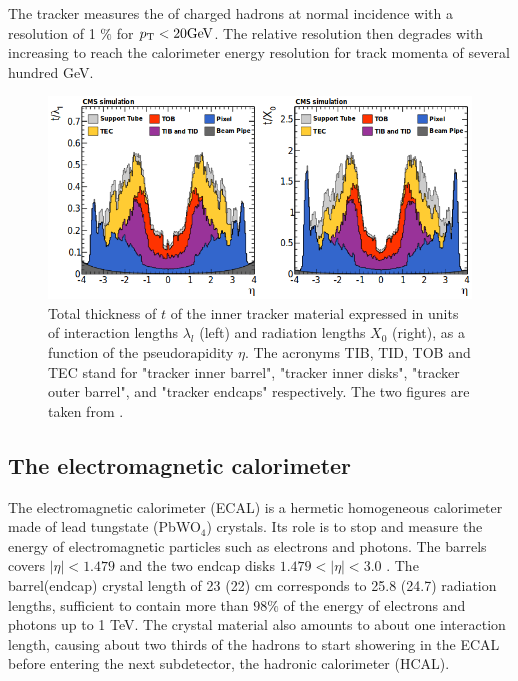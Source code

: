 The tracker measures the \pt of charged hadrons at normal incidence with a resolution of 1 $\%$ for $p_{\mathrm{T}} < 20 \mathrm{GeV}$. The relative resolution then degrades with increasing \pt to reach the calorimeter energy resolution for track momenta of several hundred GeV.

\begin{figure}
    \centering
    \includegraphics[width=\textwidth]{Images/trackerthickness.png}
    \caption{Total thickness of $t$ of the inner tracker material expressed in units of interaction lengths $\lambda_{l}$ (left) and radiation lengths $X_{0}$ (right), as a function of the pseudorapidity $\eta$. The acronyms TIB, TID, TOB and TEC stand for "tracker inner barrel", "tracker inner disks", "tracker outer barrel", and "tracker endcaps" respectively. The two figures are taken from \cite{Collaboration_2014}.}
    \label{fig:tracker_material}
\end{figure}

\subsection{The electromagnetic calorimeter}

The electromagnetic calorimeter (ECAL) \cite{CERN-LHCC-97-033,Bloch:581342} is a hermetic homogeneous calorimeter made of lead tungstate (PbWO$_4$) crystals. Its role is to stop and measure the energy of electromagnetic particles such as electrons and photons. The barrels covers $|\eta| < 1.479$ and the two endcap disks $1.479 < |\eta| < 3.0$ . The barrel(endcap) crystal length of 23 (22) cm corresponds to 25.8 (24.7) radiation lengths, sufficient to contain more than $98\%$ of the energy of electrons and photons up to 1 TeV. The crystal material also amounts to about one interaction length, causing about two thirds of the hadrons to start showering in the ECAL before entering the next subdetector, the hadronic calorimeter (HCAL).

